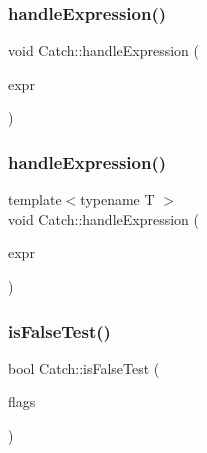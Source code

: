 \mbox{\label{namespace_catch_a65af25091f2ab61056e166765963e525}} 
\subsubsection{\texorpdfstring{handleExpression()}{handleExpression()}\hspace{0.1cm}{\footnotesize\ttfamily [1/2]}}
{\footnotesize\ttfamily void Catch\+::handle\+Expression (\begin{DoxyParamCaption}\item[{\mbox{\hyperlink{struct_catch_1_1_i_transient_expression}{I\+Transient\+Expression}} const \&}]{expr }\end{DoxyParamCaption})}

\mbox{\label{namespace_catch_af2c93db76668a981e75ae835699efce7}} 
\subsubsection{\texorpdfstring{handleExpression()}{handleExpression()}\hspace{0.1cm}{\footnotesize\ttfamily [2/2]}}
{\footnotesize\ttfamily template$<$typename T $>$ \\
void Catch\+::handle\+Expression (\begin{DoxyParamCaption}\item[{\mbox{\hyperlink{class_catch_1_1_expr_lhs}{Expr\+Lhs}}$<$ T $>$ const \&}]{expr }\end{DoxyParamCaption})}

\mbox{\label{namespace_catch_a93ef4e3e307a2021ca0d41b32c0e54b0}} 
\subsubsection{\texorpdfstring{isFalseTest()}{isFalseTest()}}
{\footnotesize\ttfamily bool Catch\+::is\+False\+Test (\begin{DoxyParamCaption}\item[{int}]{flags }\end{DoxyParamCaption})\hspace{0.3cm}{\ttfamily [inline]}}

